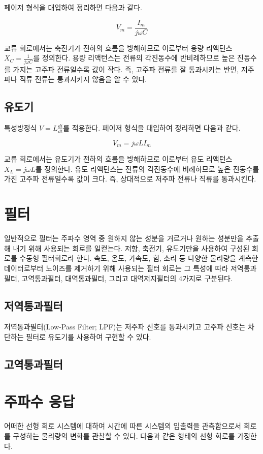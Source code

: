\documentclass{article}
\begin{document}
페이저 형식을 대입하여 정리하면 다음과 같다.

\begin{equation}
    V_m=\frac{I_m}{j\omega C}
\end{equation}

교류 회로에서는 축전기가 전하의 흐름을 방해하므로 이로부터 용량 리액턴스 $X_C=\frac{1}{j\omega C}$를 정의한다. 용량 리액턴스는 전류의 각진동수에 반비례하므로 높은 진동수를 가지는 고주파 전류일수록 값이 작다. 즉, 고주파 전류를 잘 통과시키는 반면, 저주파나 직류 전류는 통과시키지 않음을 알 수 있다.


\subsection{유도기}
특성방정식 $V=L\frac{di}{dt}$를 적용한다. 페이저 형식을 대입하여 정리하면 다음과 같다.

\begin{equation}
    V_m=j\omega LI_m
\end{equation}

교류 회로에서는 유도기가 전하의 흐름을 방해하므로 이로부터 유도 리액턴스 $X_L=j\omega L$를 정의한다. 유도 리액턴스는 전류의 각진동수에 비례하므로 높은 진동수를 가진 고주파 전류일수록 값이 크다. 즉, 상대적으로 저주파 전류나 직류를 통과시킨다.

\section{필터}
일반적으로 필터는 주파수 영역 중 원하지 않는 성분을 거르거나 원하는 성분만을 추출해 내기 위해 사용되는 회로를 일컫는다. 저항, 축전기, 유도기만을 사용하여 구성된 회로를 수동형 필터회로라 한다. 속도, 온도, 가속도, 힘, 소리 등 다양한 물리량을 계측한 데이터로부터 노이즈를 제거하기 위해 사용되는 필터 회로는 그 특성에 따라 저역통과필터, 고역통과필터, 대역통과필터, 그리고 대역저지필터의 4가지로 구분된다.

\subsection{저역통과필터}
저역통과필터(Low-Pass Filter; LPF)는 저주파 신호를 통과시키고 고주파 신호는 차단하는 필터로
유도기를 사용하여 구현할 수 있다.

\subsection{고역통과필터}


\section{주파수 응답}
어떠한 선형 회로 시스템에 대하여 시간에 따른 시스템의 입출력을 관측함으로서 회로를 구성하는 물리량의 변화를 관찰할 수 있다. 다음과 같은 형태의 선형 회로를 가정한다.
\end{document}
